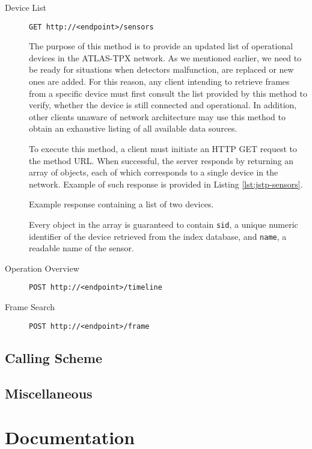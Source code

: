 \begin{description}
	\item[Device List]
	\texttt{GET http://<endpoint>/sensors}

	The purpose of this method is to provide an updated list of operational devices in the ATLAS-TPX network. As we mentioned earlier, we need to be ready for situations when detectors malfunction, are replaced or new ones are added. For this reason, any client intending to retrieve frames from a specific device must first consult the list provided by this method to verify, whether the device is still connected and operational. In addition, other clients unaware of network architecture may use this method to obtain an exhaustive listing of all available data sources.

	To execute this method, a client must initiate an HTTP GET request to the method URL. When successful, the server responds by returning an array of objects, each of which corresponds to a single device in the network. Example of such response is provided in Listing \ref{lst:jstp-sensors}.

	\begin{listing}
	    \caption{Example response containing a list of two devices.}
	    \label{lst:jstp-sensors}
	\end{listing}

	Every object in the array is guaranteed to contain \texttt{sid}, a unique numeric identifier of the device retrieved from the index database, and \texttt{name}, a readable name of the sensor.

	\item[Operation Overview]
	\texttt{POST http://<endpoint>/timeline}


	\item[Frame Search]
	\texttt{POST http://<endpoint>/frame}
\end{description}

\subsection{Calling Scheme}

\subsection{Miscellaneous}

\section{Documentation}

